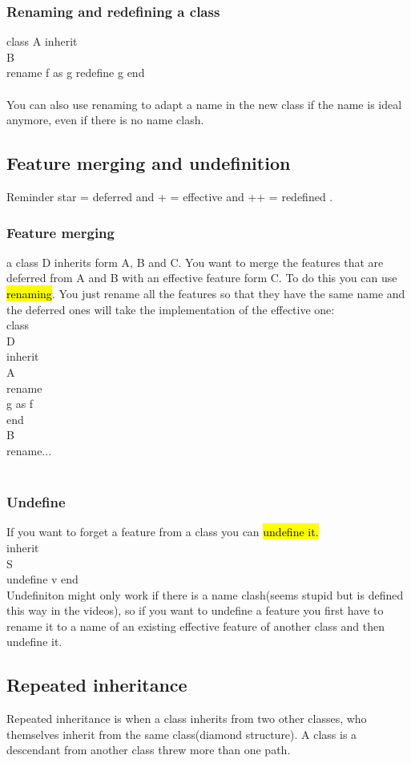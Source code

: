 \documentclass[11pt]{article}
\newcommand\tab[1][1cm]{\hspace*{#1}}
\begin{document}
\subsubsection{Renaming and redefining a class}
class A inherit\\\tab B\\\tab\tab rename f as g redefine g end\\\\You can also use renaming to adapt a name in the new class if the name is ideal anymore, even if there is no name clash.
\subsection{Feature merging and undefinition}
Reminder star = deferred and + = effective and ++ = redefined . 
\subsubsection{Feature merging}
a class D inherits form A, B and C. You want to merge the features that are deferred from A and B with an effective feature form C. To do this you can use \hl{renaming}. You just rename all  the features so that they have the same name and the deferred ones will take the implementation of the effective one:\\class\\\tab D\\inherit\\\tab A\\\tab\tab rename\\\tab\tab\tab g as f\\\tab\tab end\\\tab B\\\tab\tab rename...\\\\
\subsubsection{Undefine}
If you want to forget a feature from a class you can \hl{undefine it.}\\inherit\\\tab S\\\tab\tab undefine v end\\Undefiniton might only work if there is a name clash(seems stupid but is defined this way in the videos), so if you want to undefine a feature you first have to rename it to a name of an existing effective feature of another class and then undefine it.
\subsection{Repeated inheritance}
Repeated inheritance is when a class inherits from two other classes, who themselves inherit from the same class(diamond structure). A class is a descendant from another class threw more than one path.
\end{document}
